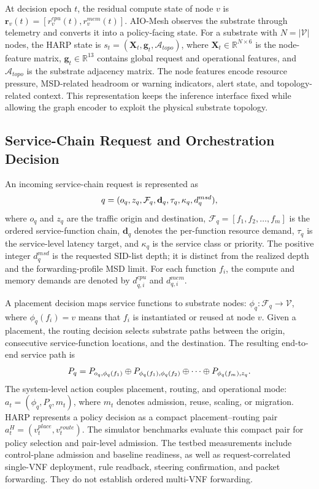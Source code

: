 \documentclass[final,5p]{elsarticle}
\newcommand{\rev}[1]{\textcolor{revisiongreen}{#1}}
\let\newrev\rev
\begin{document}
At decision epoch \(t\), the residual compute state of node \(v\) is $\mathbf{r}_v(t)=\left[r_v^{cpu}(t),r_v^{mem}(t)\right]$. AIO-Mesh observes the substrate through telemetry and converts it into a policy-facing state. For a substrate with \(N=|\mathcal{V}|\) nodes, the HARP state is $s_t=(\mathbf{X}_t,\mathbf{g}_t,\mathcal{A}_{topo})$, where \(\mathbf{X}_t\in\mathbb{R}^{N\times 6}\) is the node-feature matrix, \(\mathbf{g}_t\in\mathbb{R}^{13}\) contains global request and operational features, and \(\mathcal{A}_{topo}\) is the substrate adjacency matrix. The node features encode resource pressure, MSD-related headroom or warning indicators, alert state, and topology-related context. This representation keeps the inference interface fixed while allowing the graph encoder to exploit the physical substrate topology.

\subsection{Service-Chain Request and Orchestration Decision}
\label{subsec:sfc_model}

An incoming service-chain request is represented as
\begin{equation}
\newrev{q=(o_q,z_q,\mathcal{F}_q,\mathbf{d}_q,\tau_q,\kappa_q,d_q^{msd}),}
\end{equation}
where \(o_q\) and \(z_q\) are the traffic origin and destination, \(\mathcal{F}_q=[f_1,f_2,\ldots,f_m]\) is the ordered service-function chain, \(\mathbf{d}_q\) denotes the per-function resource demand, \(\tau_q\) is the service-level latency target, and \(\kappa_q\) is the service class or priority. \newrev{The positive integer \(d_q^{msd}\) is the requested SID-list depth; it is distinct from the realized depth and the forwarding-profile MSD limit.} For each function \(f_i\), the compute and memory demands are denoted by \(d_{q,i}^{cpu}\) and \(d_{q,i}^{mem}\).

A placement decision maps service functions to substrate nodes: $\phi_q:\mathcal{F}_q\rightarrow\mathcal{V}$, where \(\phi_q(f_i)=v\) means that \(f_i\) is instantiated or reused at node \(v\). Given a placement, the routing decision selects substrate paths between the origin, consecutive service-function locations, and the destination. The resulting end-to-end service path is
\begin{equation}
\rev{P_q=P_{o_q,\phi_q(f_1)}\oplus P_{\phi_q(f_1),\phi_q(f_2)}\oplus\cdots\oplus P_{\phi_q(f_m),z_q}.}
\label{eq:full_chain_path}
\end{equation}
\newrev{The system-level action couples placement, routing, and operational mode: $a_t=(\phi_q,P_q,m_t)$, where \(m_t\) denotes admission, reuse, scaling, or migration. HARP represents a policy decision as a compact placement--routing pair \(a_t^H=(v_t^{place},v_t^{route})\). The simulator benchmarks evaluate this compact pair for policy selection and pair-level admission. The testbed measurements include control-plane admission and baseline readiness, as well as request-correlated single-VNF deployment, rule readback, steering confirmation, and packet forwarding. They do not establish ordered multi-VNF forwarding.}
\end{document}
